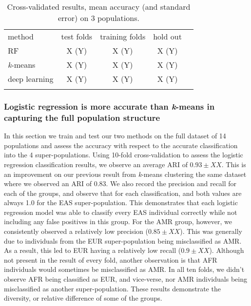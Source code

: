 \documentclass{llncs}
\newcommand{\kMeans}{\textit{k}-means}
\begin{document}
{%

\begin{table}
\caption{Cross-validated results, mean accuracy (and standard error) on 3 populations.}
\begin{center}
\renewcommand{\arraystretch}{1.4}
\setlength\tabcolsep{3pt}
\begin{tabular}{lcccc}
\hline\noalign{\smallskip}
method  & test folds & training folds & hold out \\
RF  & X (Y) & X (Y) & X (Y) \\
\kMeans & X (Y) & X (Y) & X (Y) \\
deep learning & X (Y) & X (Y) & X (Y) \\
\noalign{\smallskip}
\hline
\end{tabular}
\end{center}
\end{table}

\subsubsection{Logistic regression is more accurate than \kMeans{} in capturing the full population structure}
In this section we train and test our two methods on the full dataset of 14 populations and assess the accuracy with respect to the accurate classification into the 4 super-populations.
Using 10-fold cross-validation to assess the logistic regression classification results, we observe an average ARI of \(0.93 \pm{} XX\). This is an improvement on our previous result from \kMeans{} clustering the same dataset
where we observed an ARI of \(0.83\).
We also record the precision and recall for each of the groups, and observe that for each classification, and both values are always 1.0 for the EAS super-population. This demonstrates that each logistic regression model was able to classify every EAS individual correctly while not including any false positives in this group.
For the AMR group, however, we consistently observed a relatively low precision (\(0.85\pm{} XX \)). This was generally due to individuals from the EUR super-population being misclassified as AMR. As a result, this led to EUR having a relatively low recall (\(0.9 \pm XX \)).
Although not present in the result of every fold, another observation is that AFR individuals would sometimes be misclassified as AMR. In all ten folds, we didn't observe AFR being classified as EUR, and vice-verse, nor AMR individuals being misclassified as another super-population.
These results demonstrate the diversity, or relative difference of some of the groups. 

}
\end{document}
